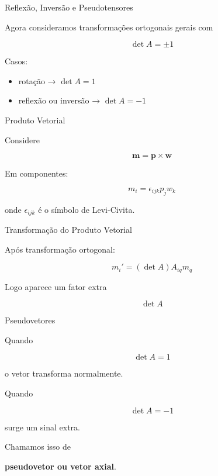 \documentclass[aspectratio=169]{beamer}
\begin{document}
\begin{frame}{Reflexão, Inversão e Pseudotensores}

Agora consideramos transformações ortogonais gerais
com

\[
\det A = \pm1
\]

Casos:

\begin{itemize}
\item rotação → $\det A=1$
\item reflexão ou inversão → $\det A=-1$
\end{itemize}

\end{frame}

\begin{frame}{Produto Vetorial}

Considere

\[
\mathbf m = \mathbf p \times \mathbf w
\]

Em componentes:

\[
m_i = \epsilon_{ijk} p_j w_k
\]

onde $\epsilon_{ijk}$ é o símbolo de Levi-Civita.

\end{frame}

\begin{frame}{Transformação do Produto Vetorial}

Após transformação ortogonal:

\[
m_i' = (\det A) A_{iq} m_q
\]

Logo aparece um fator extra

\[
\det A
\]

\end{frame}

\begin{frame}{Pseudovetores}

Quando

\[
\det A = 1
\]

o vetor transforma normalmente.

Quando

\[
\det A = -1
\]

surge um sinal extra.

Chamamos isso de

\textbf{pseudovetor ou vetor axial}.

\end{frame}
\end{document}
